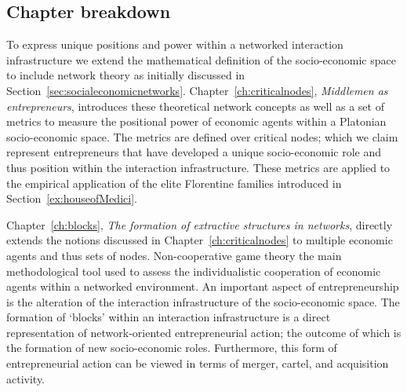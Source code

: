 \subsection*{Chapter breakdown}

To express unique positions and power within a networked interaction infrastructure we extend the mathematical definition of the socio-economic space to include network theory as initially discussed in Section~\ref{sec:socialeconomicnetworks}. Chapter~\ref{ch:criticalnodes}, \emph{Middlemen as entrepreneurs}, introduces these theoretical network concepts as well as a set of metrics to measure the positional power of economic agents within a Platonian socio-economic space. The metrics are defined over critical nodes; which we claim represent entrepreneurs that have developed a unique socio-economic role and thus position within the interaction infrastructure. These metrics are applied to the empirical application of the elite Florentine families introduced in Section~\ref{ex:houseofMedici}.

Chapter~\ref{ch:blocks}, \emph{The formation of extractive structures in networks}, directly extends the notions discussed in Chapter~\ref{ch:criticalnodes} to multiple economic agents and thus sets of nodes. Non-cooperative game theory the main methodological tool used to assess the individualistic cooperation of economic agents within a networked environment. An important aspect of entrepreneurship is the alteration of the interaction infrastructure of the socio-economic space. The formation of `blocks' within an interaction infrastructure is a direct representation of network-oriented entrepreneurial action; the outcome of which is the formation of new socio-economic roles. Furthermore, this form of entrepreneurial action can be viewed in terms of merger, cartel, and acquisition activity.